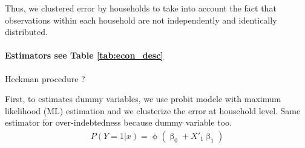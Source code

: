 \documentclass[a4paper, 11pt, onecolumn]{article}
\begin{document}
Thus, we clustered error by households to take into account the fact that observations within each household are not independently and identically distributed.



\paragraph{Estimators see Table \ref{tab:econ_desc}}

Heckman procedure ? \cite{Puhani2000}
\cite{Heckman1976}

First, to estimates dummy variables, we use probit modele with maximum likelihood (ML) estimation and we clusterize the error at household level.
Same estimator for over-indebtedness because dummy variable too. 
\begin{equation}\label{eq:probit}
\begin{split}
P(Y=1|x)=\upphi(\upbeta_{0}+X'_{1}\upbeta_{1})
\end{split}
\end{equation}
\end{document}
